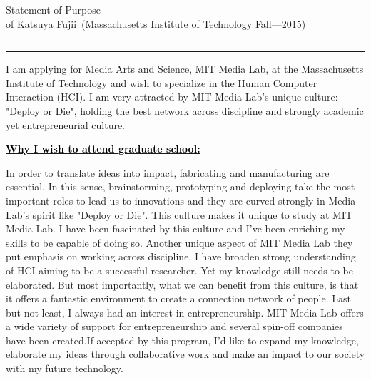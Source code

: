 \documentclass{article}
\newcommand{\soptitle}{Statement of Purpose}
\newcommand{\yourname}{Katsuya Fujii}
\newcommand{\statement}[1]{\par\medskip
  \underline{\textcolor{black}{\textbf{#1:}}}\space
}
\begin{document}
\begin{center}\LARGE\soptitle\\
\large of \yourname\ (Massachusetts Institute of Technology Fall---2015)
\end{center}

\hrule
\vspace{1pt}
\hrule height 1pt

\bigskip


I am applying for Media Arts and Science, MIT Media Lab, at the Massachusetts Institute of Technology and wish to specialize in the Human Computer Interaction (HCI). 
I am very attracted by MIT Media Lab's unique culture:  "Deploy or Die", holding the best network across discipline and strongly academic yet entrepreneurial culture. 



\statement{Why I wish to attend graduate school} 
In order to translate ideas into impact, fabricating and manufacturing are essential. In this sense, brainstorming, prototyping and deploying take the most important roles to lead us to innovations and they are curved strongly in Media Lab's spirit like "Deploy or Die". This culture makes it unique to study at MIT Media Lab. I have been fascinated by this culture and I've been enriching my skills to be capable of doing so. Another unique aspect of MIT Media Lab they put emphasis on working across discipline. I have broaden strong understanding of HCI aiming to be a successful researcher. Yet my knowledge still needs to be elaborated. But most importantly, what we can benefit from this culture, is that it offers a fantastic environment to create a connection network of people. Last but not least, I always had an interest in entrepreneurship. MIT Media Lab offers a wide variety of support for entrepreneurship and several spin-off companies have been created.If accepted by this program, I'd like to expand my knowledge, elaborate my ideas through collaborative work and make an impact to our society with my future technology. 
\end{document}
